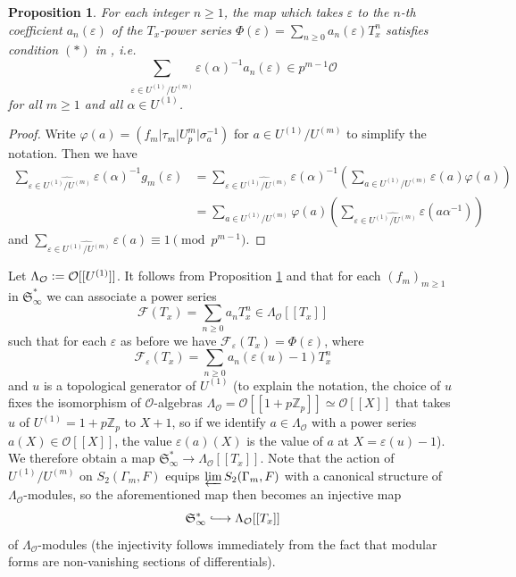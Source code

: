 \documentclass[a4paper,11pt]{amsart}
\numberwithin{equation}{section}
\theoremstyle{plain}
\newtheorem{proposition}[theorem]{Proposition}
\theoremstyle{definition}
\theoremstyle{remark}
\newcommand{\Z}{\mathbb{Z}}
\newcommand{\defeq}{\vcentcolon=}
\newcommand{\longmono}{\mbox{\;$\lhook\joinrel\longrightarrow$\;}}
\newcommand{\invlim}{\mathop{\varprojlim}\limits}
\begin{document}
\begin{proposition}\label{propohta}
For each integer $n\geq 1$, the map which takes  
$\varepsilon$ to the $n$-th coefficient $a_n(\varepsilon)$ 
of the $T_x$-power series $\Phi(\varepsilon)= \sum_{n\geq 0}a_n(\varepsilon)T_x^n$ satisfies 
condition $(*)$ in \cite[page 70]{Ohta-ES}, \emph{i.e.}
\[\sum_{\varepsilon\in\widehat{U^{(1)}/U^{(m)}}}\varepsilon(\alpha)^{-1}a_n(\varepsilon)\in p^{m-1}\mathcal{O}\]
for all $m\geq 1$ and all $\alpha\in U^{(1)}$. 
\end{proposition}
\begin{proof} Write $\varphi(a)=(f_m|\tau_m|U_p^m|\sigma_a^{-1})$ for
$a\in U^{(1)}/U^{(m)}$ to simplify the notation. Then we have 
\[\begin{split}
  \sum_{\varepsilon\in\widehat{U^{(1)}/U^{(m)}}}  \varepsilon(\alpha)^{-1}g_m(\varepsilon) &=
\sum_{\varepsilon\in\widehat{U^{(1)}/U^{(m)}}} \varepsilon(\alpha)^{-1}
\left(\sum_{a\in U^{(1)}/U^{(m)}}\varepsilon(a)\varphi(a)\right)\\
&=\sum_{a\in U^{(1)}/U^{(m)}}\varphi(a)\left(\sum_{\varepsilon\in\widehat{U^{(1)}/U^{(m)}}}\varepsilon(a\alpha^{-1})\right)
\end{split}\] and $\sum_{\varepsilon\in\widehat{U^{(1)}/U^{(m)}}}\varepsilon(a)\equiv 1\pmod {p^{m-1}}$. 
\end{proof}

Let $\Lambda_\mathcal{O}\defeq \mathcal{O}[[U^{(1)}]]$. It follows from Proposition \ref{propohta} and \cite[Lemma (2.4.2)]{Ohta-ES} that for each $(f_m)_{m\geq 1}$ in $\mathfrak{S}_\infty^*$ we can associate a power series\[\mathcal{F}(T_x)=\sum_{n\geq 0}a_nT_x^n\in\Lambda_\mathcal{O}[[T_x]]\] 
such that for each $\varepsilon$ as before we have 
$\mathcal{F}_\varepsilon(T_x)=\Phi(\varepsilon)$,
where 
\[\mathcal{F}_\varepsilon(T_x)= \sum_{n\geq 0}a_n(\varepsilon(u)-1)T_x^n\]
and $u$ is a topological generator of $U^{(1)}$ 
(to explain the notation, 
the choice of $u$ fixes the isomorphism of $\mathcal{O}$-algebras 
$\Lambda_{\mathcal{O}}=\mathcal{O}[[1+p\Z_p]]\simeq  \mathcal{O}[[X]]$ that takes 
$u$ of $U^{(1)}=1+p\Z_p$ to $X+1$, so if we identify $a\in \Lambda_\mathcal{O}$ 
with a power series $a(X)\in \mathcal{O}[[X]]$, 
the value $\varepsilon(a)(X)$ is the value of $a$ at $X=\varepsilon(u)-1$). 
We therefore obtain a 
map $\mathfrak{S}_\infty^*\rightarrow \Lambda_\mathcal{O}[[T_x]]$. Note that the action of $U^{(1)}/U^{(m)}$ 
on $S_2(\Gamma_m,F)$ equips $\invlim S_2(\Gamma_m,F)$ with a canonical structure of $\Lambda_\mathcal{O}$-modules, so the aforementioned map then becomes an injective map
\begin{equation}\label{STexp}
\mathfrak{S}_\infty^*\longmono \Lambda_\mathcal{O}[[T_x]]\end{equation} of $\Lambda_\mathcal{O}$-modules (the injectivity follows immediately from the fact that modular forms are non-vanishing sections of differentials). 
\end{document}
